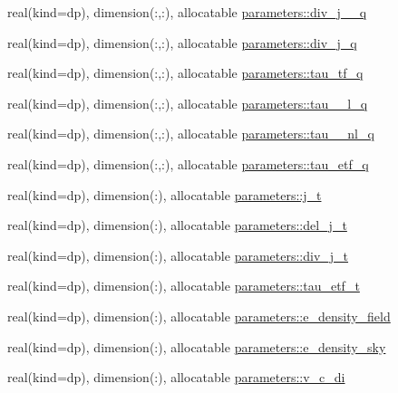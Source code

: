 \begin{DoxyCompactItemize}
real(kind=dp), dimension(\+:,\+:), allocatable \mbox{\hyperlink{group__OTHER__DENSITIES_ga42f7b6eda54c2f6b7dbfbc5a0d3a1bf4}{parameters\+::div\+\_\+j\+\_\+\_\+q}}
\item 
real(kind=dp), dimension(\+:,\+:), allocatable \mbox{\hyperlink{group__OTHER__DENSITIES_ga8181dfebaf3cbf23118c8322b1eed86d}{parameters\+::div\+\_\+j\+\_\+q}}
\item 
real(kind=dp), dimension(\+:,\+:), allocatable \mbox{\hyperlink{group__OTHER__DENSITIES_gab6c3712299b2394aa1cdc011d9373ab8}{parameters\+::tau\+\_\+tf\+\_\+q}}
\item 
real(kind=dp), dimension(\+:,\+:), allocatable \mbox{\hyperlink{group__OTHER__DENSITIES_ga045973682837700d382d75a8f6de7d9c}{parameters\+::tau\+\_\+\_\+l\+\_\+q}}
\item 
real(kind=dp), dimension(\+:,\+:), allocatable \mbox{\hyperlink{group__OTHER__DENSITIES_ga64b5af532da52ba869f0fba447812146}{parameters\+::tau\+\_\+\_\+nl\+\_\+q}}
\item 
real(kind=dp), dimension(\+:,\+:), allocatable \mbox{\hyperlink{group__OTHER__DENSITIES_ga8fa22b66605b27eaece8dbd54577ebc8}{parameters\+::tau\+\_\+etf\+\_\+q}}
\item 
real(kind=dp), dimension(\+:), allocatable \mbox{\hyperlink{group__OTHER__DENSITIES_ga403b0aed00d1b8df4af16d47bc09977f}{parameters\+::j\+\_\+t}}
\item 
real(kind=dp), dimension(\+:), allocatable \mbox{\hyperlink{group__OTHER__DENSITIES_ga1c75e349365b3d0cd01f2f1ed6fc3a06}{parameters\+::del\+\_\+j\+\_\+t}}
\item 
real(kind=dp), dimension(\+:), allocatable \mbox{\hyperlink{group__OTHER__DENSITIES_gaae73460a531438ad3711b017dc727066}{parameters\+::div\+\_\+j\+\_\+t}}
\item 
real(kind=dp), dimension(\+:), allocatable \mbox{\hyperlink{group__OTHER__DENSITIES_ga38f8f27b19a3324faae16c6831f551db}{parameters\+::tau\+\_\+etf\+\_\+t}}
\item 
real(kind=dp), dimension(\+:), allocatable \mbox{\hyperlink{group__OTHER__DENSITIES_gadb82cb07fdaadb4c3d4fc703ec7d0f32}{parameters\+::e\+\_\+density\+\_\+field}}
\item 
real(kind=dp), dimension(\+:), allocatable \mbox{\hyperlink{group__OTHER__DENSITIES_ga899215cff7de8d505ca9437a2c7a9e5d}{parameters\+::e\+\_\+density\+\_\+sky}}
\item 
real(kind=dp), dimension(\+:), allocatable \mbox{\hyperlink{group__OTHER__DENSITIES_ga7503ebd6515d35346e8989c0ace67040}{parameters\+::v\+\_\+c\+\_\+di}}

\end{DoxyCompactItemize}
